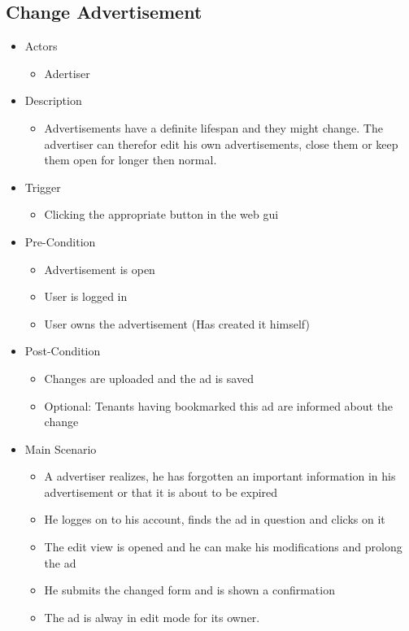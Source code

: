 \documentclass[a4paper,11pt]{article}
\begin{document}
\subsection*{Change Advertisement}
\begin{itemize}
	\item Actors
		\begin{itemize}
			\item Adertiser
		\end{itemize}
	\item Description
		\begin{itemize}
			\item Advertisements have a definite lifespan and they might change. The advertiser can therefor edit his own advertisements, close them or keep them open for longer then normal.
		\end{itemize}
	\item Trigger
		\begin{itemize}
			\item Clicking the appropriate button in the web gui
		\end{itemize}
	\item Pre-Condition
		\begin{itemize}
			\item Advertisement is open
			\item User is logged in
			\item User owns the advertisement (Has created it himself)
		\end{itemize}
	\item Post-Condition
		\begin{itemize}
			\item Changes are uploaded and the ad is saved
			\item Optional: Tenants having bookmarked this ad are informed about the change
		\end{itemize}
	\item Main Scenario
		\begin{itemize}
			\item A advertiser realizes, he has forgotten an important information in his advertisement or that it is about to be expired
			\item He logges on to his account, finds the ad in question and clicks on it
			\item The edit view is opened and he can make his modifications and prolong the ad
			\item He submits the changed form and is shown a confirmation
			\item The ad is alway in edit mode for its owner.
		\end{itemize}
\end{itemize}
\end{document}

